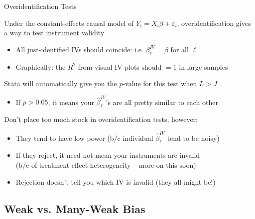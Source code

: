 \documentclass{beamer}
\begin{document}
\begin{frame}{Overidentification Tests}

Under the constant-effects causal model of $Y_i=X_i^\prime\beta+\varepsilon_i$, overidentification gives a way to test instrument validity
\begin{itemize}
\item All just-identified IVs should coincide: i.e. $\beta_\ell^{IV}=\beta$ for all $\ell$
\item Graphically: the $R^2$ from visual IV plots should $= 1$ in large samples
\end{itemize}\medskip\pause{}
Stata will automatically give you the $p$-value for this test when $L>J$
\begin{itemize}
\item If $p>0.05$, it means your $\hat{\beta}_\ell^{IV}$'s are all pretty similar to each other
\end{itemize}\medskip\pause{}
Don't place too much stock in overidentification tests, however:
\begin{itemize}
\item They tend to have low power (b/c individual $\hat{\beta}_\ell^{IV}$ tend to be noisy)
\item If they reject, it need not mean your instruments are invalid \\ (b/c of treatment effect heterogeneity -- more on this soon)
\item Rejection doesn't tell you which IV is invalid (they all might be!)
\end{itemize}
\end{frame}

\subsection{Weak vs. Many-Weak Bias}
\end{document}
